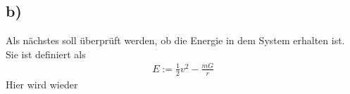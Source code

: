 \subsection*{b)}
Als nächstes soll überprüft werden, ob die Energie in dem System erhalten ist.
Sie ist definiert als
\begin{align}
	E:=\frac{1}{2}v^2-\frac{mG}{r}
\end{align}
Hier wird wieder 
